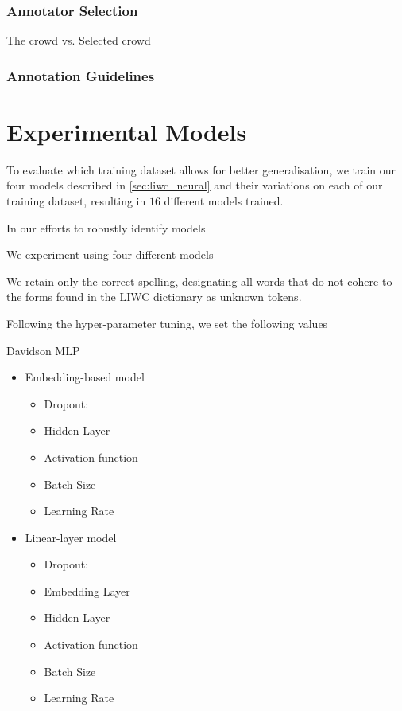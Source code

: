 \subsubsection{Annotator Selection}

The crowd vs. Selected crowd

\subsubsection{Annotation Guidelines}


\section{Experimental Models}

To evaluate which training dataset allows for better generalisation, we train our four models described in \autoref{sec:liwc_neural} and their variations on each of our training dataset, resulting in $16$ different models trained.

In our efforts to robustly identify models

We experiment using four different models

We retain only the correct spelling, designating all words that do not cohere to the forms found in the LIWC dictionary as unknown tokens.


Following the hyper-parameter tuning, we set the following values


Davidson MLP
\begin{itemize}
  \item Embedding-based model
    \begin{itemize}
      \item Dropout:
      \item Hidden Layer
      \item Activation function
      \item Batch Size
      \item Learning Rate
    \end{itemize}
  \item Linear-layer model
    \begin{itemize}
      \item Dropout:
      \item Embedding Layer
      \item Hidden Layer
      \item Activation function
      \item Batch Size
      \item Learning Rate
    \end{itemize}
\end{itemize}

